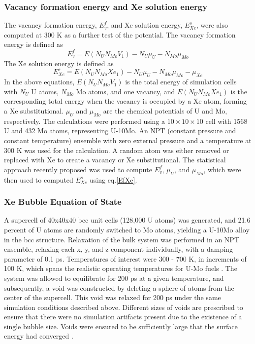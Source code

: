 \documentclass[review]{elsarticle}
\begin{document}
\subsubsection{Vacancy formation energy and Xe solution energy}
The vacancy formation energy, $E^f_v$, and Xe solution energy, $E^s_{Xe}$, were also computed at 300 K as a further test of the potential. The vacancy formation energy is defined as
\begin{equation}\label{Efv}
E^f_v = E(N_U N_{Mo} V_1) - N_U \mu_U - N_{Mo} \mu_{Mo} 
\end{equation}
 The Xe solution energy is defined as 
 \begin{equation}\label{EfXe}
E^s_{Xe} = E(N_UN_{Mo}Xe_1)-N_U\mu_U-N_{Mo}\mu_{Mo}-\mu_{Xe}
\end{equation}
In the above equations, $E(N_UN_{Mo}V_1)$ is the total energy of simulation cells with $N_U$ U atoms, $N_{Mo}$ Mo atoms, and one vacancy, and $E(N_UN_{Mo}Xe_1)$ is the corresponding total energy when the vacancy is occupied by a Xe atom, forming a Xe substitutional. $\mu_U$ and $\mu_{Mo}$ are the chemical potentials of U and Mo, respectively. The calculations were performed using a $10\times10\times10$ cell with 1568 U and 432 Mo atoms, representing U-10Mo. An NPT (constant pressure and constant temperature) ensemble with zero external pressure and a temperature at 300 K was used for the calculation. A random atom was either removed or replaced with Xe to create a vacancy or Xe substitutional. The statistical approach recently proposed \cite{zhang2021} was used to compute $E_v^f$, $\mu_U$, and $\mu_{Mo}$, which were then used to computed $E^s_{Xe}$ using eq.\ref{EfXe}.  

\subsubsection{Xe Bubble Equation of State}

A supercell of 40x40x40 bcc unit cells (128,000 U atoms) was generated, and 21.6 percent of U atoms are randomly switched to Mo atoms, yielding a U-10Mo alloy in the bcc structure. Relaxation of the bulk system was performed in an NPT ensemble, relaxing each x, y, and z component individually, with a damping parameter of 0.1 ps. Temperatures of interest were 300 - 700 K, in increments of 100 K, which spans the realistic operating temperatures for U-Mo fuels \cite{umo_prelim_report2017}. The system was allowed to equilibrate for 200 ps at a given temperature, and subsequently, a void was constructed by deleting a sphere of atoms from the center of the supercell. This void was relaxed for 200 ps under the same simulation conditions described above. Different sizes of voids are prescribed to ensure that there were no simulation artifacts present due to the existence of a single bubble size. Voids were ensured to be sufficiently large that the surface energy had converged \cite{Beeler2020}. 
\end{document}

